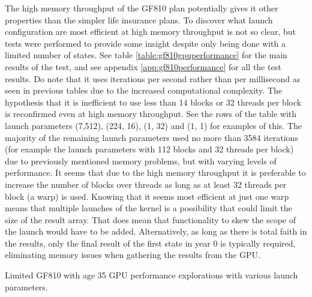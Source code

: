 The high memory throughput of the GF810 plan potentially gives it other properties than the simpler life insurance plans.
To discover what launch configuration are most efficient at high memory throughput is not so clear, but tests were performed to provide some insight despite only being done with a limited number of states.
See table \ref{table:gf810gpuperformance} for the main results of the test, and see appendix \ref{app:gf810performance} for all the test results.
Do note that it uses iterations per second rather than per millisecond as seen in previous tables due to the increased computational complexity.
The hypothesis that it is inefficient to use less than 14 blocks or 32 threads per block is reconfirmed even at high memory throughput.
See the rows of the table with launch parameters (7,512), (224, 16), (1, 32) and (1, 1) for examples of this.
The majority of the remaining launch parameters used no more than 3584 iterations (for example the launch parameters with 112 blocks and 32 threads per block) due to previously mentioned memory problems, but with varying levels of performance.
It seems that due to the high memory throughput it is preferable to increase the number of blocks over threads as long as at least 32 threads per block (a warp) is used.
Knowing that it seems most efficient at just one warp means that multiple launches of the kernel is a possibility that could limit the size of the result array.
That does mean that functionality to skew the scope of the launch would have to be added.
Alternatively, as long as there is total faith in the results, only the final result of the first state in year 0 is typically required, eliminating memory issues when gathering the results from the GPU.

\begin{table}[h!]
\centering
{}
\caption{Limited GF810 with age 35 GPU performance explorations with various launch parameters.\label{table:gf810gpuperformance}}
\caption*{Launch parameters are of the form (blocks, threads per block). Kernel time is in seconds.}
\end{table}

